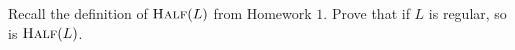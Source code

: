 \begin{problem}
  Recall the definition of $\textsc{Half}(L)$ from Homework $1$.
  Prove that if $L$ is regular, so is $\textsc{Half}(L)$.
  \begin{Answer}

  \end{Answer}
\end{problem}
